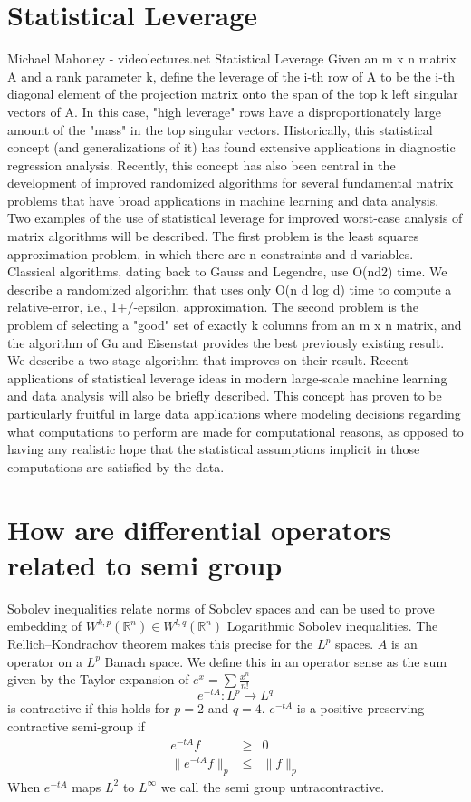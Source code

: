 \documentclass[a4paper]{article}
\newcommand{\Real}{\mathbb R}
\theoremstyle{plain}
\theoremstyle{definition}
\theoremstyle{remark}
\numberwithin{equation}{section}
\begin{document}
\section{Statistical Leverage}
Michael Mahoney - videolectures.net Statistical Leverage Given an m x n matrix A and a rank parameter k, define the leverage of the i-th row of A to be the i-th diagonal element of the projection matrix onto the span of the top k left singular vectors of A. In this case, "high leverage" rows have a disproportionately large amount of the "mass" in the top singular vectors. Historically, this statistical concept (and generalizations of it) has found extensive applications in diagnostic regression analysis. Recently, this concept has also been central in the development of improved randomized algorithms for several fundamental matrix problems that have broad applications in machine learning and data analysis. Two examples of the use of statistical leverage for improved worst-case analysis of matrix algorithms will be described. The first problem is the least squares approximation problem, in which there are n constraints and d variables. Classical algorithms, dating back to Gauss and Legendre, use O(nd2) time. We describe a randomized algorithm that uses only O(n d log d) time to compute a relative-error, i.e., 1+/-epsilon, approximation. The second problem is the problem of selecting a "good" set of exactly k columns from an m x n matrix, and the algorithm of Gu and Eisenstat provides the best previously existing result. We describe a two-stage algorithm that improves on their result. Recent applications of statistical leverage ideas in modern large-scale machine learning and data analysis will also be briefly described. This concept has proven to be particularly fruitful in large data applications where modeling decisions regarding what computations to perform are made for computational reasons, as opposed to having any realistic hope that the statistical assumptions implicit in those computations are satisfied by the data.

\section{How are differential operators related to semi group}
Sobolev inequalities relate norms of Sobolev spaces and can be used to prove embedding of $W^{k,p}(\Real^n) \in W^{l,q}(\Real^n)$ Logarithmic Sobolev inequalities.  The Rellich–Kondrachov theorem makes this precise for the $L^p$ spaces.
$A$ is an operator on a $L^p$ Banach space. We define this in an operator sense as the sum given by the Taylor expansion of $e^x = \sum \frac{x^n}{n!}$
\begin{equation*}
  e^{-t A} : L^p \rightarrow L^q
\end{equation*} is contractive if this holds for $p=2$ and $q=4$.
$e^{-t A}$ is a positive preserving contractive semi-group if
\begin{eqnarray*}
  e^{-t A} f &\geq& 0 \\
  \parallel e^{-t A} f \parallel_p &\leq& \parallel f \parallel_p
\end{eqnarray*}
When $e^{-t A}$ maps $L^2$ to $L^\infty$ we call the semi group untracontractive.
\end{document}
